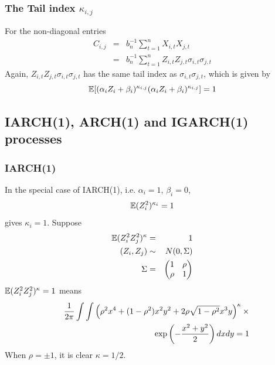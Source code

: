 \documentclass{beamer}
\begin{document}
  \begin{frame}
  \frametitle{The Tail index $\kappa_{i,j}$}
    For the non-diagonal entries
    \begin{eqnarray*}
      C_{i, j} &=& b_n^{-1} \sum_{t=1}^n X_{i, t} X_{j, t} \\
      &=& b_n^{-1} \sum_{t=1}^n Z_{i, t} Z_{j, t} \sigma_{i, t} \sigma_{j, t}
    \end{eqnarray*}
    Again, $Z_{i, t} Z_{j, t} \sigma_{i, t} \sigma_{j, t}$ has the
    same tail index as $\sigma_{i, t} \sigma_{j, t}$, which is given
    by
    \[
    \mathbb{E} [(\alpha_i Z_i + \beta_i)^{\kappa_{i,j}}(\alpha_i Z_i +
    \beta_i)^{\kappa_{i,j}}] = 1
    \]
  \end{frame}





\subsection{IARCH(1), ARCH(1) and IGARCH(1) processes}
\begin{frame}
  \frametitle{IARCH(1)}
  In the special case of IARCH(1), i.e. $\alpha_{i} = 1$, $\beta_{i} = 0$,
  \[
  \mathbb{E} (Z_i^2)^{\kappa_i} = 1
  \]
  gives $\kappa_i = 1$. Suppose
  \begin{eqnarray*}
    \mathbb{E} (Z_i^2 Z_j^2)^\kappa &=& 1 \\
    (Z_i, Z_j) &\sim& N(0, \Sigma) \\
    \Sigma &=&
    \begin{pmatrix}
      1 & \rho \\
      \rho & 1
    \end{pmatrix}
  \end{eqnarray*}
  $\mathbb{E} (Z_i^2 Z_j^2)^\kappa = 1$ means
  \begin{eqnarray*}
    && {1 \over 2\pi}
    \int \int
    \left(
      \rho^2 x^4 + (1 - \rho^2) x^2 y^2 + 2 \rho \sqrt{1 - \rho^2} x^3 y
    \right)^\kappa \times \\
    &&
    \exp\left(
      -{x^2 + y^2 \over 2}
    \right)
    dx dy = 1
  \end{eqnarray*}
  When $\rho = \pm 1$, it is clear $\kappa = 1/2$.  
\end{frame}
\end{document}
